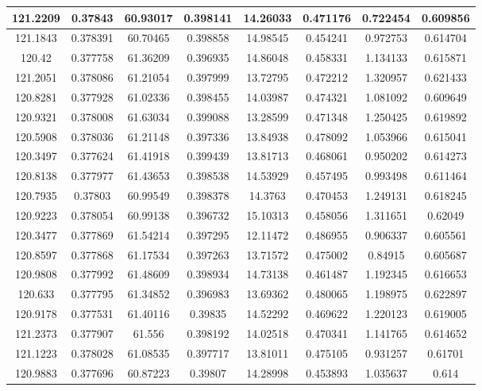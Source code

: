 \documentclass[preprint,review,11pt]{elsarticle}
\begin{document}
\begin{longtable}{|c|c|c|c|c|c|c|c|}
				121.2209 & 0.37843  & 60.93017 & 0.398141 & 14.26033 & 0.471176 & 0.722454 & 0.609856 \\ \hline
				121.1843 & 0.378391 & 60.70465 & 0.398858 & 14.98545 & 0.454241 & 0.972753 & 0.614704 \\ \hline
				120.42   & 0.377758 & 61.36209 & 0.396935 & 14.86048 & 0.458331 & 1.134133 & 0.615871 \\ \hline
				121.2051 & 0.378086 & 61.21054 & 0.397999 & 13.72795 & 0.472212 & 1.320957 & 0.621433 \\ \hline
				120.8281 & 0.377928 & 61.02336 & 0.398455 & 14.03987 & 0.474321 & 1.081092 & 0.609649 \\ \hline
				120.9321 & 0.378008 & 61.63034 & 0.399088 & 13.28599 & 0.471348 & 1.250425 & 0.619892 \\ \hline
				120.5908 & 0.378036 & 61.21148 & 0.397336 & 13.84938 & 0.478092 & 1.053966 & 0.615041 \\ \hline
				120.3497 & 0.377624 & 61.41918 & 0.399439 & 13.81713 & 0.468061 & 0.950202 & 0.614273 \\ \hline
				120.8138 & 0.377977 & 61.43653 & 0.398538 & 14.53929 & 0.457495 & 0.993498 & 0.611464 \\ \hline
				120.7935 & 0.37803  & 60.99549 & 0.398378 & 14.3763  & 0.470453 & 1.249131 & 0.618245 \\ \hline
				120.9223 & 0.378054 & 60.99138 & 0.396732 & 15.10313 & 0.458056 & 1.311651 & 0.62049  \\ \hline
				120.3477 & 0.377869 & 61.54214 & 0.397295 & 12.11472 & 0.486955 & 0.906337 & 0.605561 \\ \hline
				120.8597 & 0.377868 & 61.17534 & 0.397263 & 13.71572 & 0.475002 & 0.84915  & 0.605687 \\ \hline
				120.9808 & 0.377992 & 61.48609 & 0.398934 & 14.73138 & 0.461487 & 1.192345 & 0.616653 \\ \hline
				120.633  & 0.377795 & 61.34852 & 0.396983 & 13.69362 & 0.480065 & 1.198975 & 0.622897 \\ \hline
				120.9178 & 0.377531 & 61.40116 & 0.39835  & 14.52292 & 0.469622 & 1.220123 & 0.619005 \\ \hline
				121.2373 & 0.377907 & 61.556   & 0.398192 & 14.02518 & 0.470341 & 1.141765 & 0.614652 \\ \hline
				121.1223 & 0.378028 & 61.08535 & 0.397717 & 13.81011 & 0.475105 & 0.931257 & 0.61701  \\ \hline
				120.9883 & 0.377696 & 60.87223 & 0.39807  & 14.28998 & 0.453893 & 1.035637 & 0.614    \\ \hline

\end{longtable}
\end{document}

